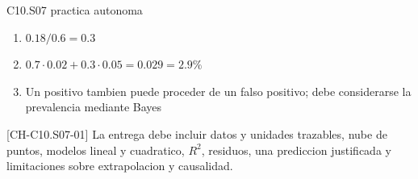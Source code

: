 \begin{shortanswer}{C10.S07 practica autonoma}
\begin{enumerate}[label=\textbf{PX-C10.S07-\arabic*:}, leftmargin=*]
  \item \(0.18/0.6=0.3\)
  \item \(0.7\cdot0.02+0.3\cdot0.05=0.029=2.9\%\)
  \item Un positivo tambien puede proceder de un falso positivo; debe considerarse la
  prevalencia mediante Bayes
\end{enumerate}
\end{shortanswer}

\begin{shortanswer}{[CH-C10.S07-01]}
La entrega debe incluir datos y unidades trazables, nube de puntos, modelos lineal y cuadratico,
\(R^2\), residuos, una prediccion justificada y limitaciones sobre extrapolacion y causalidad.
\end{shortanswer}
